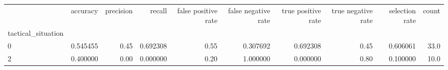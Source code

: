 \begin{tabular}{lrrrrrrrrr}
\toprule
{} &  accuracy &  precision &    recall &  false positive rate &  false negative rate &  true positive rate &  true negative rate &  selection rate &  count \\
tactical\_situation &           &            &           &                      &                      &                     &                     &                 &        \\
\midrule
0                  &  0.545455 &       0.45 &  0.692308 &                 0.55 &             0.307692 &            0.692308 &                0.45 &        0.606061 &   33.0 \\
2                  &  0.400000 &       0.00 &  0.000000 &                 0.20 &             1.000000 &            0.000000 &                0.80 &        0.100000 &   10.0 \\
\bottomrule
\end{tabular}
